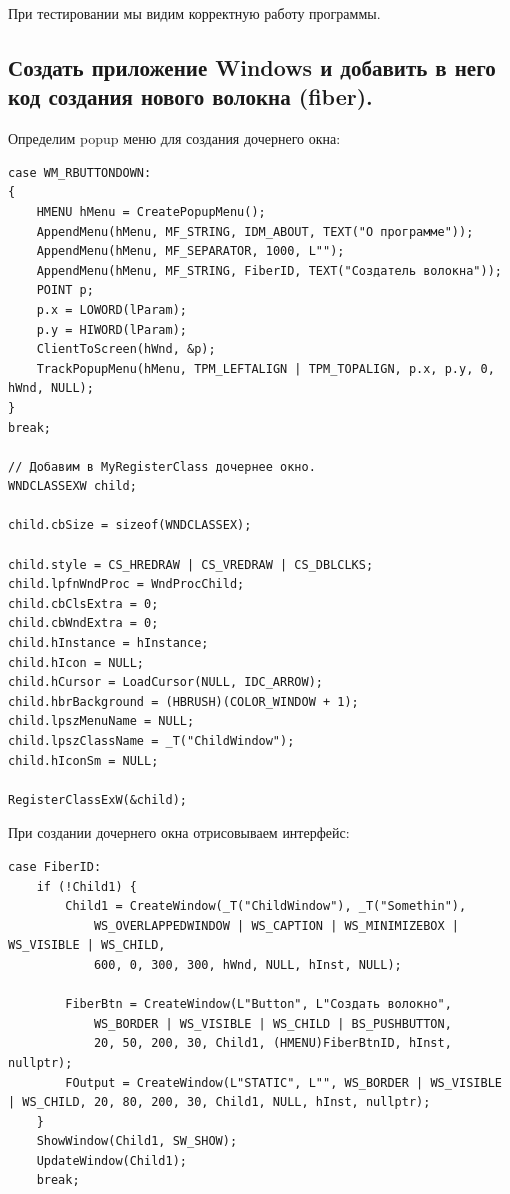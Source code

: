 \documentclass[12pt]{article}
\begin{document}
При тестировании мы видим корректную работу программы.

\subsection{Создать приложение Windows и добавить в него код создания нового волокна (fiber).}

Определим popup меню для создания дочернего окна:\\
\begin{verbatim}
case WM_RBUTTONDOWN:
{
    HMENU hMenu = CreatePopupMenu();
    AppendMenu(hMenu, MF_STRING, IDM_ABOUT, TEXT("О программе"));
    AppendMenu(hMenu, MF_SEPARATOR, 1000, L"");
    AppendMenu(hMenu, MF_STRING, FiberID, TEXT("Создатель волокна"));
    POINT p;
    p.x = LOWORD(lParam);
    p.y = HIWORD(lParam);
    ClientToScreen(hWnd, &p);
    TrackPopupMenu(hMenu, TPM_LEFTALIGN | TPM_TOPALIGN, p.x, p.y, 0, hWnd, NULL);
}
break;

// Добавим в MyRegisterClass дочернее окно.
WNDCLASSEXW child;

child.cbSize = sizeof(WNDCLASSEX);

child.style = CS_HREDRAW | CS_VREDRAW | CS_DBLCLKS;
child.lpfnWndProc = WndProcChild;
child.cbClsExtra = 0;
child.cbWndExtra = 0;
child.hInstance = hInstance;
child.hIcon = NULL;
child.hCursor = LoadCursor(NULL, IDC_ARROW);
child.hbrBackground = (HBRUSH)(COLOR_WINDOW + 1);
child.lpszMenuName = NULL;
child.lpszClassName = _T("ChildWindow");
child.hIconSm = NULL;

RegisterClassExW(&child);
\end{verbatim}

При создании дочернего окна отрисовываем интерфейс:\\
\begin{verbatim}
case FiberID:
    if (!Child1) {
        Child1 = CreateWindow(_T("ChildWindow"), _T("Somethin"), 
            WS_OVERLAPPEDWINDOW | WS_CAPTION | WS_MINIMIZEBOX | WS_VISIBLE | WS_CHILD, 
            600, 0, 300, 300, hWnd, NULL, hInst, NULL);

        FiberBtn = CreateWindow(L"Button", L"Создать волокно", 
            WS_BORDER | WS_VISIBLE | WS_CHILD | BS_PUSHBUTTON, 
            20, 50, 200, 30, Child1, (HMENU)FiberBtnID, hInst, nullptr);
        FOutput = CreateWindow(L"STATIC", L"", WS_BORDER | WS_VISIBLE | WS_CHILD, 20, 80, 200, 30, Child1, NULL, hInst, nullptr);
    }
    ShowWindow(Child1, SW_SHOW);
    UpdateWindow(Child1);
    break;
\end{verbatim}
\end{document}
